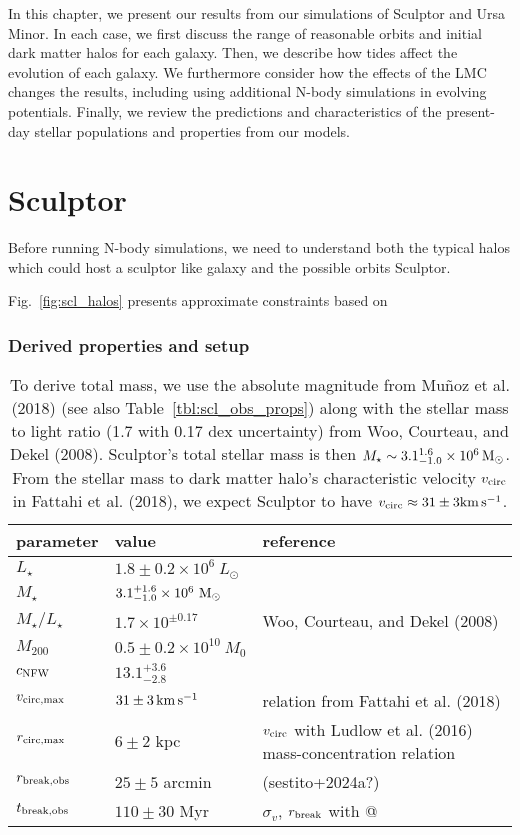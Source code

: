 In this chapter, we present our results from our simulations of Sculptor
and Ursa Minor. In each case, we first discuss the range of reasonable
orbits and initial dark matter halos for each galaxy. Then, we describe
how tides affect the evolution of each galaxy. We furthermore consider
how the effects of the LMC changes the results, including using
additional N-body simulations in evolving potentials. Finally, we review
the predictions and characteristics of the present-day stellar
populations and properties from our models.

\section{Sculptor}\label{sculptor}

Before running N-body simulations, we need to understand both the
typical halos which could host a sculptor like galaxy and the possible
orbits Sculptor.

Fig.~\ref{fig:scl_halos} presents approximate constraints based on

\subsubsection{Derived properties and
setup}\label{derived-properties-and-setup}

\begin{table*}[t]
\centering
\caption[Derived Properties of Sculptor]{To derive total mass, we use the absolute magnitude from Muñoz et al. (2018) (see also Table \ref{tbl:scl_obs_props}) along with the stellar mass to light ratio (1.7 with 0.17 dex uncertainty) from Woo, Courteau, and Dekel (2008). Sculptor’s total stellar mass is then $M_\star \sim 3.1_{-1.0}^{1.6} \times 10^6\,{\rm M}_{\odot}$. From the stellar mass to dark matter halo’s characteristic velocity $v_{\rm circ}$ in Fattahi et al. (2018), we expect Sculptor to have $v_{\rm circ} \approx 31 \pm 3 {\rm km\,s^{-1}}$. }
\label{tbl:scl_derived_props}
\begin{tabular}{lll}
\toprule
parameter & value & reference\\
\midrule
$L_\star$ & $1.8\pm0.2\times10^6\ L_\odot$ & \\
$M_\star$ & $3.1_{-1.0}^{+1.6} \times10^6\ {\rm M}_\odot$ & \\
$M_\star / L_\star$ & $1.7\times 10^{\pm 0.17}$ & Woo, Courteau, and Dekel (2008)\\
$M_{200}$ & $0.5 \pm 0.2\times10^{10}\ M_0$ & \\
$c_{\rm NFW}$ & $13.1_{-2.8}^{+3.6}$ & \\
$v_{\rm circ, max}$ & $31\pm 3\,{\rm km\,s^{-1}}$ & relation from Fattahi et al. (2018)\\
$r_{\rm circ, max}$ & $6 \pm 2$ kpc & $v_{\rm circ}$ with Ludlow et al. (2016) mass-concentration relation\\
$r_{\rm break, obs}$ & $25 \pm 5$ arcmin & (sestito+2024a?)\\
$t_{\rm break, obs}$ & $110\pm30$ Myr & $\sigma_v$, $r_{\rm break}$ with @\\
\bottomrule
\end{tabular}
\end{table*}

